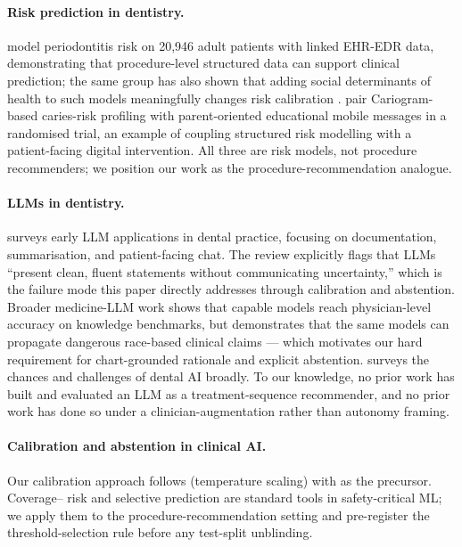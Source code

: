 \documentclass[preprint,authoryear,1p,12pt]{elsarticle}
\begin{document}
\paragraph{Risk prediction in dentistry.} \cite{patel2026perio} model
periodontitis risk on 20{,}946 adult patients with linked EHR-EDR data,
demonstrating that procedure-level structured data can support clinical
prediction; the same group has also shown that adding social
determinants of health to such models meaningfully changes risk
calibration \citep{patel2025sdoh}. \cite{varghese2025cariogram} pair
Cariogram-based caries-risk profiling with parent-oriented educational
mobile messages in a randomised trial, an example of coupling
structured risk modelling with a patient-facing digital intervention.
All three are risk models, not procedure recommenders; we position
our work as the procedure-recommendation analogue.

\paragraph{LLMs in dentistry.}
\cite{farhadinia2024llm} surveys early LLM applications in dental
practice, focusing on documentation, summarisation, and patient-facing
chat. The review explicitly flags that LLMs ``present clean, fluent
statements without communicating uncertainty,'' which is the failure mode
this paper directly addresses through calibration and abstention.
Broader medicine-LLM work \citep{singhal2023large,nori2023capabilities}
shows that capable models reach physician-level accuracy on knowledge
benchmarks, but \cite{omiye2024large} demonstrates that the same models
can propagate dangerous race-based clinical claims --- which motivates
our hard requirement for chart-grounded rationale and explicit
abstention. \cite{schwendicke2020artificial} surveys the chances and
challenges of dental AI broadly. To our knowledge, no prior work has
built and evaluated an LLM as a treatment-sequence recommender, and no
prior work has done so under a clinician-augmentation rather than
autonomy framing.

\paragraph{Calibration and abstention in clinical AI.}
Our calibration approach follows \cite{guo2017calibration} (temperature
scaling) with \cite{platt2000probabilistic} as the precursor. Coverage--
risk and selective prediction are standard tools in safety-critical ML;
we apply them to the procedure-recommendation setting and pre-register
the threshold-selection rule before any test-split unblinding.
\end{document}

